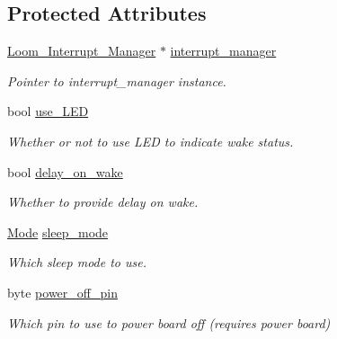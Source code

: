 \subsection*{Protected Attributes}
\begin{DoxyCompactItemize}
\item 
\hyperlink{class_loom___interrupt___manager}{Loom\+\_\+\+Interrupt\+\_\+\+Manager} $\ast$ \hyperlink{class_loom___sleep___manager_a41c366974539c348f16c6b6e7f6ddae1}{interrupt\+\_\+manager}
\begin{DoxyCompactList}\small\item\em Pointer to interrupt\+\_\+manager instance. \end{DoxyCompactList}\item 
bool \hyperlink{class_loom___sleep___manager_ae9ffd9f5310fdac6d1df1f23741598a6}{use\+\_\+\+L\+ED}
\begin{DoxyCompactList}\small\item\em Whether or not to use L\+ED to indicate wake status. \end{DoxyCompactList}\item 
bool \hyperlink{class_loom___sleep___manager_a8404672e11d82bea2ba0934f1c197764}{delay\+\_\+on\+\_\+wake}
\begin{DoxyCompactList}\small\item\em Whether to provide delay on wake. \end{DoxyCompactList}\item 
\hyperlink{class_loom___sleep___manager_ab1cb2baaf00c386048490c3787a2de13}{Mode} \hyperlink{class_loom___sleep___manager_a3fdbc0a285480a155459ddc675a2482c}{sleep\+\_\+mode}
\begin{DoxyCompactList}\small\item\em Which sleep mode to use. \end{DoxyCompactList}\item 
byte \hyperlink{class_loom___sleep___manager_a46e360dc9b81c2a76e5f7f8d485dbae2}{power\+\_\+off\+\_\+pin}
\begin{DoxyCompactList}\small\item\em Which pin to use to power board off (requires power board) \end{DoxyCompactList}\end{DoxyCompactItemize}
